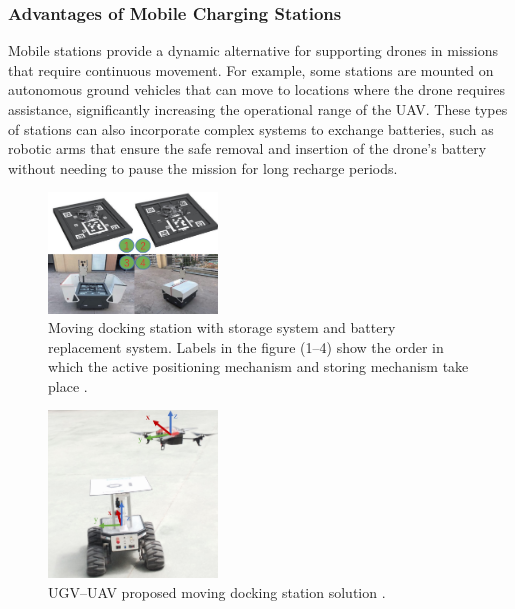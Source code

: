 \subsubsection{Advantages of Mobile Charging Stations}
    Mobile stations provide a dynamic alternative for supporting drones in missions that require continuous movement. For example, some stations are mounted on autonomous ground vehicles that can move to locations where the drone requires assistance, significantly increasing the operational range of the UAV. These types of stations can also incorporate complex systems to exchange batteries, such as robotic arms that ensure the safe removal and insertion of the drone's battery without needing to pause the mission for long recharge periods.
    
    \begin{figure}[H]
        \centering
        \includegraphics[width=0.4\textwidth]{pictures/mobile_1.png}
        \caption{Moving docking station with storage system and battery replacement system. Labels in the figure (1–4) show the order in which the active positioning mechanism and storing mechanism take place \cite{grlj_docking_stations}.}
        \label{fig:mobile_charging}
    \end{figure}

    \begin{figure}[H]
        \centering
        \includegraphics[width=0.4\textwidth]{pictures/mobile_2.png}
        \caption{UGV–UAV proposed moving docking station solution \cite{grlj_docking_stations}.}
        \label{fig:mobile_charging}
    \end{figure}

